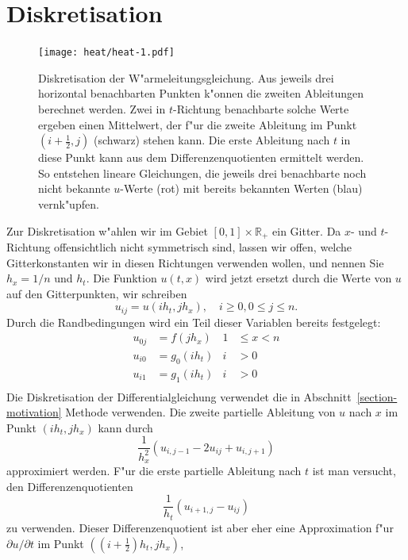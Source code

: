 \section{Diskretisation\label{heat:section-diskretisation}}
\begin{figure}
\begin{center}
\texttt{[image: heat/heat-1.pdf]}
\end{center}
\caption{Diskretisation der W"armeleitungsgleichung. 
Aus jeweils drei horizontal benachbarten Punkten k"onnen die zweiten
Ableitungen berechnet werden.
Zwei in $t$-Richtung benachbarte solche Werte ergeben einen Mittelwert,
der f"ur die zweite Ableitung im Punkt $(i+\frac12,j)$ (schwarz)
stehen kann. Die erste Ableitung nach $t$ in diese Punkt kann aus
dem Differenzenquotienten ermittelt werden. So entstehen lineare
Gleichungen, die jeweils drei benachbarte noch nicht bekannte
$u$-Werte (rot) mit bereits bekannten Werten (blau) vernk"upfen.
\label{heat:diskretisation1}}
\end{figure}
Zur Diskretisation w"ahlen wir im Gebiet $[0,1]\times \mathbb R_+$ ein
Gitter. 
Da $x$- und $t$-Richtung offensichtlich nicht symmetrisch sind,
lassen wir offen, welche Gitterkonstanten wir in diesen Richtungen
verwenden wollen, und nennen Sie $h_x=1/n$ und $h_t$. 
Die Funktion $u(t,x)$ wird jetzt ersetzt durch die Werte von $u$ auf
den Gitterpunkten, wir schreiben
\[
u_{ij} = u(ih_t, jh_x),\quad i\ge 0, 0\le j \le n.
\]
Durch die Randbedingungen wird ein Teil dieser Variablen bereits
festgelegt:
\begin{align*}
u_{0j}&=f(jh_x)&1&\le x < n\\
u_{i0}&=g_0(ih_t)&i&>0\\
u_{i1}&=g_1(ih_t)&i&>0\\
\end{align*}
Die Diskretisation der Differentialgleichung verwendet die in
Abschnitt~\ref{section-motivation} Methode verwenden.
Die zweite partielle Ableitung von $u$ nach $x$ im Punkt $(ih_t, jh_x)$ 
kann durch
\begin{equation}
\frac1{h_x^2}(u_{i,j-1}-2u_{ij}+u_{i,j+1})
\label{heat:2ableitung}
\end{equation}
approximiert werden.
F"ur die erste partielle Ableitung nach $t$ ist man versucht,
den Differenzenquotienten
\begin{equation}
\frac1{h_t}(u_{i+1,j}-u_{ij})
\label{heat:1ableitung}
\end{equation}
zu verwenden.
Dieser Differenzenquotient ist aber eher eine Approximation f"ur
$\partial u/\partial t$ im Punkt $((i+\frac12)h_t, jh_x)$,

